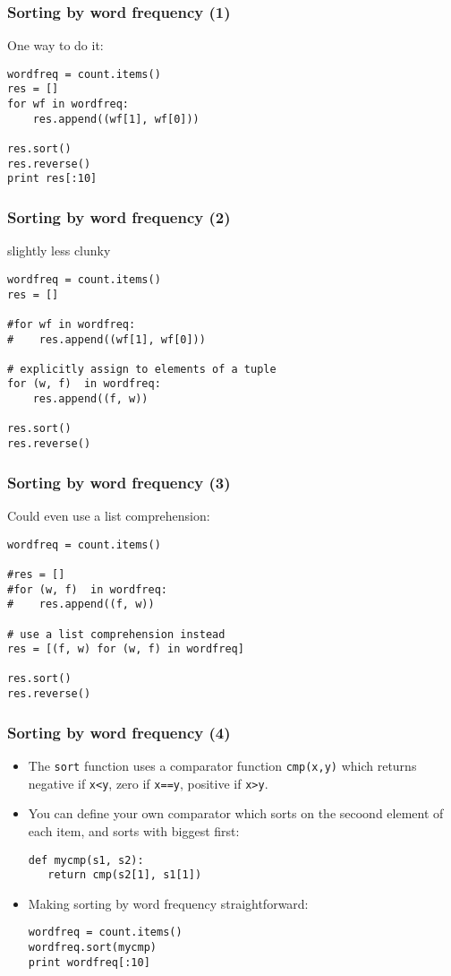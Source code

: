 \begin{frame}[fragile]
  \frametitle{Sorting by word frequency (1)}

  One way to do it:
\begin{verbatim}
wordfreq = count.items()
res = []
for wf in wordfreq:
    res.append((wf[1], wf[0]))

res.sort()
res.reverse()
print res[:10]
\end{verbatim}
  
\end{frame}

\begin{frame}[fragile]
  \frametitle{Sorting by word frequency (2)}

  slightly less clunky
\begin{verbatim}
wordfreq = count.items()
res = []

#for wf in wordfreq:
#    res.append((wf[1], wf[0]))

# explicitly assign to elements of a tuple
for (w, f)  in wordfreq:        
    res.append((f, w))

res.sort()
res.reverse()
\end{verbatim}
\end{frame}

\begin{frame}[fragile]
  \frametitle{Sorting by word frequency (3)}

  Could even use a list comprehension:
\begin{verbatim}
wordfreq = count.items()

#res = []
#for (w, f)  in wordfreq:        
#    res.append((f, w))

# use a list comprehension instead
res = [(f, w) for (w, f) in wordfreq]

res.sort()
res.reverse()
\end{verbatim}
\end{frame}

\begin{frame}[fragile]
  \frametitle{Sorting by word frequency (4)}

  \begin{itemize}
  \item<1->   The \texttt{sort} function uses a comparator function
    \texttt{cmp(x,y)} which returns negative if \verb+x<y+, zero if
    \verb+x==y+, positive if \verb+x>y+.
  \item<2-> You can define your own comparator which sorts on the secoond element of
  each item, and sorts with biggest first:
\begin{verbatim}
def mycmp(s1, s2):
   return cmp(s2[1], s1[1])
\end{verbatim}
\item<3-> Making sorting by word frequency straightforward:
\begin{verbatim}
wordfreq = count.items()
wordfreq.sort(mycmp)
print wordfreq[:10]
\end{verbatim}
\end{itemize}
\end{frame}


